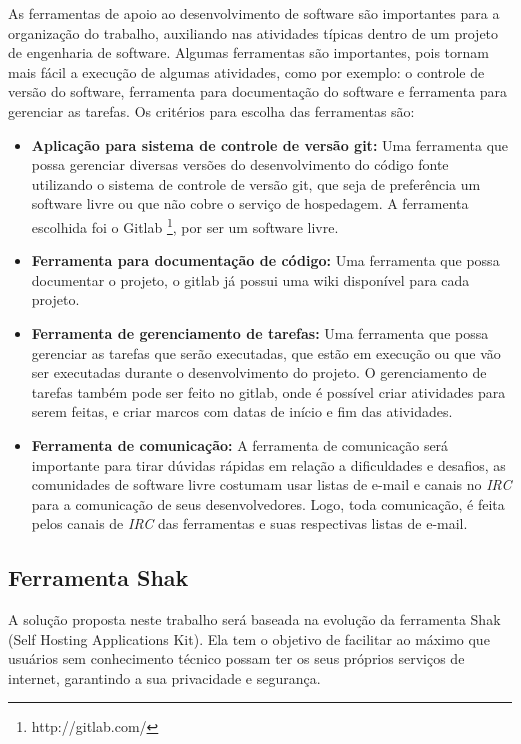 As ferramentas de apoio ao desenvolvimento de software são importantes para a
organização do trabalho, auxiliando nas atividades típicas dentro de um projeto
de engenharia de software. Algumas ferramentas são importantes, pois tornam mais fácil
a execução de algumas atividades, como por exemplo: o controle de versão do software,
ferramenta para documentação do software e ferramenta para gerenciar as tarefas.
Os critérios para escolha das ferramentas são:

\begin{itemize}
  \item \textbf{Aplicação para sistema de controle de versão git:} Uma ferramenta que
  possa gerenciar diversas versões do desenvolvimento do código fonte utilizando
  o sistema de controle de versão git, que seja de preferência um software livre
  ou que não cobre o serviço de hospedagem. A ferramenta escolhida foi o Gitlab \footnote{http://gitlab.com/}, por ser um software livre.
  \item \textbf{Ferramenta para documentação de código:} Uma ferramenta que possa
  documentar o projeto, o gitlab já possui uma wiki disponível para cada projeto.
  \item \textbf{Ferramenta de gerenciamento de tarefas:} Uma ferramenta que possa
  gerenciar as tarefas que serão executadas, que estão em execução ou que vão ser executadas
  durante o desenvolvimento do projeto. O gerenciamento de tarefas também pode ser
  feito no gitlab, onde é possível criar atividades para serem feitas, e criar marcos
  com datas de início e fim das atividades.
  \item \textbf{Ferramenta de comunicação:} A ferramenta de comunicação será
  importante para tirar dúvidas rápidas em relação a dificuldades e desafios, as
  comunidades de software livre costumam usar listas de e-mail e canais no \textit{IRC}
  para a comunicação de seus desenvolvedores. Logo, toda comunicação, é feita
  pelos canais de \textit{IRC} das ferramentas e suas respectivas listas de e-mail.
\end{itemize}

\subsection{Ferramenta Shak}

A solução proposta neste trabalho será baseada na evolução da ferramenta Shak
(Self Hosting Applications Kit). Ela tem o objetivo de facilitar 
ao máximo que usuários sem conhecimento técnico possam ter os seus próprios 
serviços de internet, garantindo a sua privacidade e segurança. 

